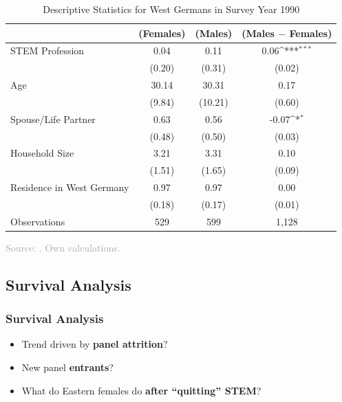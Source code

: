 \documentclass[11pt, aspectratio=1610, xcolor={dvipsnames}]{beamer}
\newcommand{\highlight}[1]{\textbf{\textcolor{PineGreen}{#1}}}
\def\sym#1{\ifmmode^{#1}\else\(^{#1}\)\fi}
\begin{document}
		\begin{frame}
		\frametitle{}
		{\linespread{1}\tiny
			\begin{table}[h]
				\centering
				\caption{Descriptive Statistics for West Germans in Survey Year 1990}
				\label{tab:descriptiveswest}
				\begin{tabular}{l*{3}{c}}
					\toprule
					& (Females) & (Males) & (Males $-$ Females) \\
					\midrule
					STEM Profession     &        0.04&       0.11&         0.06\sym{***}\\
					&       (0.20)&       (0.31)&           (0.02)\\
					\addlinespace
					Age                 &       30.14&           30.31&          0.17         \\
					&        (9.84)&         (10.21)&             (0.60)\\
					\addlinespace
					Spouse/Life Partner &        0.63&            0.56&         -0.07\sym{*}  \\
					&         (0.48)&         (0.50)&        (0.03)\\
					\addlinespace
					Household Size      &        3.21&           3.31&         0.10        \\
					&       (1.51)&        (1.65)       &      (0.09)\\
					\addlinespace
					Residence in West Germany&        0.97&         0.97&            0.00      \\
					&       (0.18)&        (0.17)&         (0.01)\\
					\midrule
					Observations        &        529&             599&            1,128               \\
					\bottomrule
				\end{tabular}
			\end{table}
		}
		
		{\scriptsize
			\textcolor{darkgray}{Source: \cite{SOEP2023}. Own calculations.}
		}
		
	\end{frame}
	
	\subsection{Survival Analysis}
	\begin{frame}
		\frametitle{Survival Analysis}
		
		\begin{itemize}
			\item Trend driven by \highlight{panel attrition}?
			\item New panel \highlight{entrants}?
			\item What do Eastern females do \highlight{after ``quitting'' STEM}?
		\end{itemize}
		
	\end{frame}
	
\end{document}
